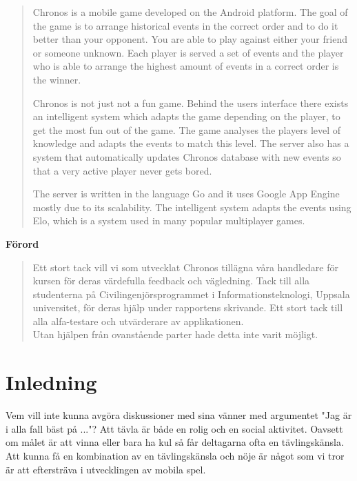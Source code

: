\documentclass[a4paper, 11pt]{article}
\begin{document}
\begin{otherlanguage}{english}
\begin{abstract}
Chronos is a mobile game developed on the Android platform. The goal of the game is to arrange historical events in the correct order and to do it better than your opponent. You are able to play against either your friend or someone unknown. Each player is served a set of events and the player who is able to arrange the highest amount of events in a correct order is the winner.

Chronos is not just not a fun game. Behind the users interface there exists an intelligent system which adapts the game depending on the player, to get the most fun out of the game. The game analyses the players level of knowledge and adapts the events to match this level. The server also has a system that automatically updates Chronos database with new events so that a very active player never gets bored. 

The server is written in the language Go and it uses Google App Engine mostly due to its scalability. The intelligent system adapts the events using Elo, which is a system used in many popular multiplayer games.
\end{abstract}
\end{otherlanguage}

\newpage

\begin{center}
\large\textbf{Förord}
\\
\begin{quote}
Ett stort tack vill vi som utvecklat Chronos tillägna våra handledare för kursen för deras värdefulla feedback och vägledning. Tack till alla studenterna på Civilingenjörsprogrammet i Informationsteknologi, Uppsala universitet, för deras hjälp under rapportens skrivande. Ett stort tack till alla alfa-testare och utvärderare av applikationen.\\ Utan hjälpen från ovanstående parter hade detta inte varit möjligt.
\end{quote}
\end{center}

\newpage

\tableofcontents
\pagebreak




\section{Inledning}
Vem vill inte kunna avgöra diskussioner med sina vänner med argumentet "Jag är i alla fall bäst på ..."? 
Att tävla är både en rolig och en social aktivitet. Oavsett om målet är att vinna eller bara ha kul så får deltagarna ofta en tävlingskänsla. Att kunna få en kombination av en tävlingskänsla och nöje är något som vi tror är att eftersträva i utvecklingen av mobila spel. 
\end{document}
